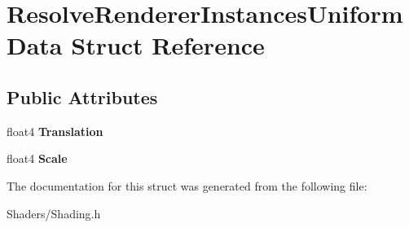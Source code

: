 \hypertarget{structResolveRendererInstancesUniformData}{}\section{Resolve\+Renderer\+Instances\+Uniform\+Data Struct Reference}
\label{structResolveRendererInstancesUniformData}
\subsection*{Public Attributes}
\begin{DoxyCompactItemize}
\item 
\mbox{\label{structResolveRendererInstancesUniformData_ad5af2d012b100087536a441ef3b64451}} 
float4 {\bfseries Translation}
\item 
\mbox{\label{structResolveRendererInstancesUniformData_a38a23f9e5542e3d731932eb5f53b7428}} 
float4 {\bfseries Scale}
\end{DoxyCompactItemize}


The documentation for this struct was generated from the following file\+:\begin{DoxyCompactItemize}
\item 
Shaders/Shading.\+h\end{DoxyCompactItemize}
